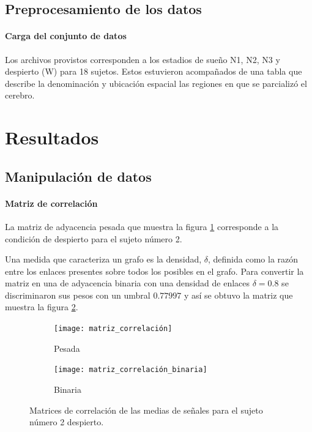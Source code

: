 \documentclass{article}
\begin{document}
\subsection{Preprocesamiento de los datos}

\paragraph{Carga del conjunto de datos} 
Los archivos provistos corresponden a los estadios de sueño N1, N2, N3 y despierto (W) para 18 sujetos.
Estos estuvieron acompañados de una tabla que describe la denominación y  ubicación espacial las regiones en que se parcializó el cerebro.



\section{Resultados}

\subsection{Manipulación de datos}

\paragraph{Matriz de correlación}
La matriz de adyacencia pesada que muestra la figura \ref{fg:matriz_correlación_pesada} corresponde a la condición de despierto para el sujeto número 2.

Una medida que caracteriza un grafo es la densidad, $\delta$, definida como la razón entre los enlaces presentes sobre todos los posibles en el grafo.
Para convertir la matriz en una de adyacencia binaria con una densidad de enlaces \(\delta = 0.8\) se discriminaron sus pesos con un umbral \(0.77997\) y así se obtuvo la matriz que muestra la figura \ref{fg:matriz_correlación_binaria}.

\begin{figure}[ht]
	\centering
	\begin{subfigure}[b]{0.3\textwidth}
		\texttt{[image: matriz\_correlación]}
		\caption{Pesada}
		\label{fg:matriz_correlación_pesada}
	\end{subfigure}
	\begin{subfigure}[b]{0.25\textwidth}
		\texttt{[image: matriz\_correlación\_binaria]}
		\caption{Binaria}
		\label{fg:matriz_correlación_binaria}
	\end{subfigure}
	\caption{Matrices de correlación de las medias de señales para el sujeto número 2 despierto. 
	}
	\label{fg:matriz_correlación}
\end{figure}
\end{document}
